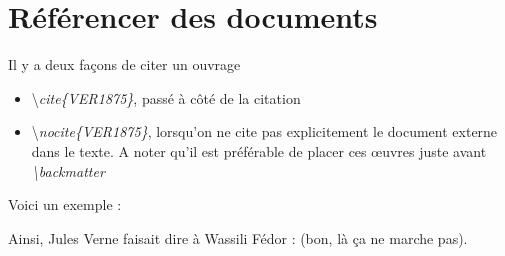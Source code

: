 \documentclass[a4paper,  10pt]{book}
\begin{document}
\section{Référencer des documents}

Il y a deux façons de citer un ouvrage 
\begin{itemize}

\item \textbackslash \emph{cite\{VER1875\}}, passé à côté de la citation
\item \textbackslash \emph{nocite\{VER1875\}}, lorsqu'on ne cite pas explicitement le document externe dans le texte. A noter qu'il est préférable de placer ces \oe uvres juste avant \emph{\textbackslash backmatter}

\end{itemize}

Voici un exemple :

Ainsi, Jules Verne faisait dire à Wassili Fédor \cite{VER1875} : (bon, là ça ne marche pas).


\backmatter %




\tableofcontents
\end{document}

